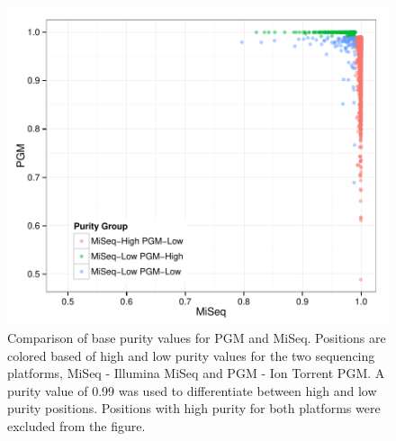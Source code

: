 \documentclass[smallextended]{svjour3}\usepackage[]{graphicx}\usepackage[]{color}
\makeatletter
\def\maxwidth{ %
  \ifdim\Gin@nat@width>\linewidth
    \linewidth
  \else
    \Gin@nat@width
  \fi
}
\newenvironment{knitrout}{}{} %
\makeatother
\begin{document}
\begin{knitrout}
\color{fgcolor}\begin{figure}

{\centering \includegraphics[width=\maxwidth]{figure/purityScatterFig-1} 

}

\caption[Comparison of base purity values for PGM and MiSeq]{Comparison of base purity values for PGM and MiSeq. Positions are colored based of high and low purity values for the two sequencing platforms, MiSeq - Illumina MiSeq and PGM - Ion Torrent PGM. A purity value of 0.99 was used to differentiate between high and low purity positions. Positions with high purity for both platforms were excluded from the figure.}\label{fig:purityScatterFig}
\end{figure}


\end{knitrout}
\end{document}
